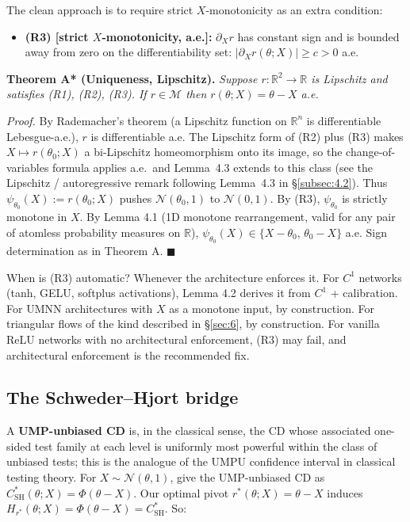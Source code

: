 \documentclass[11pt]{article}
\providecommand{\tightlist}{\setlength{\itemsep}{0pt}\setlength{\parskip}{0pt}}
\begin{document}
The clean approach is to require strict \(X\)-monotonicity as an extra
condition:

\begin{itemize}
\tightlist
\item
  \textbf{(R3) {[}strict \(X\)-monotonicity, a.e.{]}:} \(\partial_X r\)
  has constant sign and is bounded away from zero on the
  differentiability set: \(|\partial_X r(\theta; X)| \geq c > 0\) a.e.
\end{itemize}

\textbf{Theorem A* (Uniqueness, Lipschitz).} \emph{Suppose
\(r: \mathbb{R}^2 \to \mathbb{R}\) is Lipschitz and satisfies (R1),
(R2), (R3). If \(r \in \mathcal{M}\) then \(r(\theta; X) = \theta - X\)
a.e.}

\emph{Proof.} By Rademacher's theorem (a Lipschitz function on
\(\mathbb{R}^n\) is differentiable Lebesgue-a.e.), \(r\) is
differentiable a.e. The Lipschitz form of (R2) plus (R3) makes
\(X \mapsto r(\theta_0; X)\) a bi-Lipschitz homeomorphism onto its
image, so the change-of-variables formula applies a.e.\ and Lemma~4.3
extends to this class (see the Lipschitz / autoregressive remark
following Lemma~4.3 in \S\ref{subsec:4.2}). Thus
\(\psi_{\theta_0}(X) := r(\theta_0; X)\) pushes
\(\mathcal{N}(\theta_0, 1)\) to \(\mathcal{N}(0,1)\). By (R3),
\(\psi_{\theta_0}\) is strictly monotone in \(X\). By Lemma 4.1 (1D
monotone rearrangement, valid for any pair of atomless probability
measures on \(\mathbb{R}\)),
\(\psi_{\theta_0}(X) \in \{X - \theta_0,\, \theta_0 - X\}\) a.e. Sign
determination as in Theorem A. \(\blacksquare\)

When is (R3) automatic? Whenever the architecture enforces it. For
\(C^1\) networks (tanh, GELU, softplus activations), Lemma 4.2 derives
it from \(C^1\) + calibration. For UMNN architectures with \(X\) as a
monotone input, by construction. For triangular flows of the kind
described in \S\ref{sec:6}, by construction. For vanilla ReLU networks with no
architectural enforcement, (R3) may fail, and architectural enforcement
is the recommended fix.

\subsection{The Schweder--Hjort bridge}\label{subsec:4.5}

A \textbf{UMP-unbiased CD} is, in the classical sense, the CD whose
associated one-sided test family at each level is uniformly most
powerful within the class of unbiased tests; this is the analogue of the
UMPU confidence interval in classical testing theory. For
\(X \sim \mathcal{N}(\theta, 1)\), \citet[ch.~5]{SchwederHjort2016} give
the UMP-unbiased CD as
\(C^*_\mathrm{SH}(\theta; X) = \Phi(\theta - X)\). Our optimal pivot
\(r^*(\theta; X) = \theta - X\) induces
\(H_{r^*}(\theta; X) = \Phi(\theta - X) = C^*_\mathrm{SH}\). So:
\end{document}
